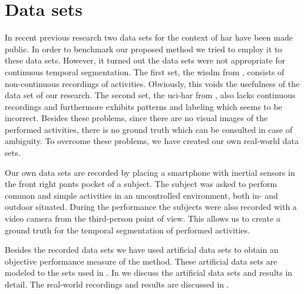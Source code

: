 \section{Data sets}
In recent previous research two data sets for the context of \gls{har} have been made public.
In order to benchmark our proposed method we tried to employ it to these data sets.
However, it turned out the data sets were not appropriate for continuous temporal segmentation.
The first set, the \gls{wisdm} from \cite{kwapisz2011activity}, consists of non-continuous recordings of activities.
Obviously, this voids the usefulness of the data set of our research.
The second set, the \gls{uci-har} from \cite{anguita2012human}, also lacks continuous recordings and furthermore exhibits patterns and labeling which seems to be incorrect.
Besides these problems, since there are no visual images of the performed activities, there is no ground truth which can be consulted in case of ambiguity.
To overcome these problems, we have created our own real-world data sets.

Our own data sets are recorded by placing a smartphone with inertial sensors in the front right pants pocket of a subject.
The subject was asked to perform common and simple activities in an uncontrolled environment, both in- and outdoor situated.
During the performance the subjects were also recorded with a video camera from the third-person point of view.
This allows us to create a ground truth for the temporal segmentation of performed activities.

Besides the recorded data sets we have used artificial data sets to obtain an objective performance measure of the method.
These artificial data sets are modeled to the sets used in \cite{camci2010change,takeuchi2006unifying}.
In  we discuss the artificial data sets and results in detail.
The real-world recordings and results are discussed in .

